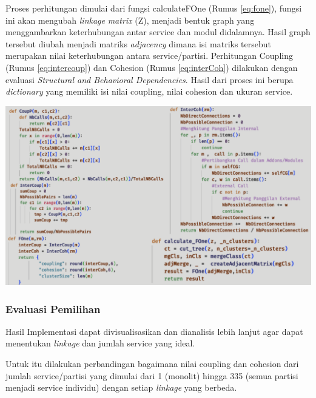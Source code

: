 Proses perhitungan dimulai dari fungsi calculateFOne (Rumus \ref{eq:fone}), fungsi ini akan mengubah \textit{linkage} \textit{matrix} (Z), menjadi bentuk graph yang menggambarkan keterhubungan antar service dan modul didalamnya. Hasil graph tersebut diubah menjadi matriks \textit{adjacency} dimana isi matriks tersebut merupakan nilai keterhubungan antara service/partisi. Perhitungan Coupling (Rumus \ref{eq:intercoup}) dan Cohesion (Rumus \ref{eq:interCoh}) dilakukan dengan evaluasi \textit{Structural and Behavioral Dependencies}. 
Hasil dari proses ini berupa \textit{dictionary} yang memiliki isi nilai coupling, nilai cohesion dan ukuran service.

\begin{center}
	\includegraphics[width=14cm]{img/bab_4/coding_evaluasi.png}
	\label{fig:coding_evaluasi}
\end{center}


\subsubsection{Evaluasi Pemilihan}
Hasil Implementasi dapat divisualisasikan dan dianalisis lebih lanjut agar dapat menentukan \textit{linkage} dan jumlah service yang ideal. 

Untuk itu dilakukan perbandingan bagaimana nilai coupling dan cohesion dari jumlah service/partisi yang dimulai dari 1 (monolit) hingga 335 (semua partisi menjadi service individu) dengan setiap \textit{linkage} yang berbeda.


